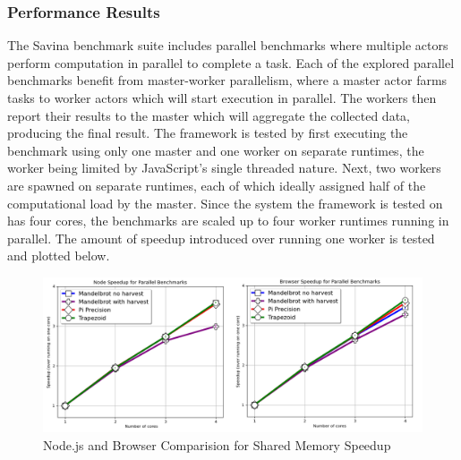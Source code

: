 \documentclass[12pt, a4paper]{report}
\theoremstyle{definition}
\theoremstyle{definition}%
\theoremstyle{definition}%
\theoremstyle{definition}%
\theoremstyle{definition}%
\theoremstyle{definition}%
\begin{document}
\subsubsection{Performance Results}
The Savina benchmark suite includes parallel benchmarks where multiple actors perform computation in parallel to complete a task. Each of the explored parallel benchmarks benefit from master-worker parallelism, where a master actor farms tasks to worker actors which will start execution in parallel. The workers then report their results to the master which will aggregate the collected data, producing the final result. The framework is tested by first executing the benchmark using only one master and one worker on separate runtimes, the worker being limited by JavaScript’s single threaded nature.  Next, two workers are spawned on separate runtimes, each of which ideally assigned half of the computational load by the master. Since the system the framework is tested on has four cores, the benchmarks are scaled up to four worker runtimes running in parallel. The amount of speedup introduced over running one worker is tested and plotted below.
\begin{figure}[H]
    \begin{centering}
        \includegraphics[width=\textwidth]{resources/shared_memory_speedup.png}
        \caption{Node.js and Browser Comparision for Shared Memory Speedup}
    \end{centering}
\end{figure}
\end{document}
